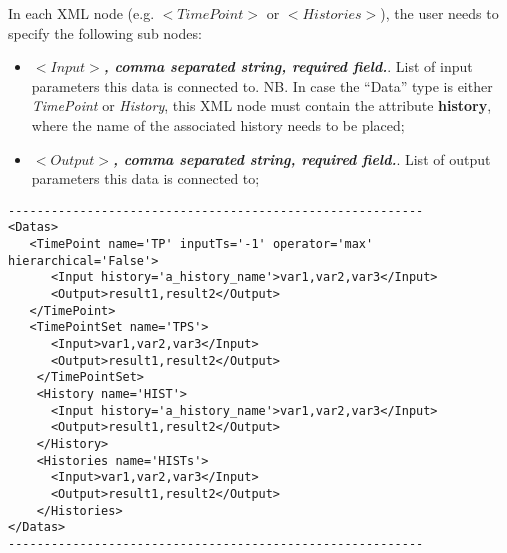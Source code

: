 \vspace{-5mm}
In each XML node (e.g. $<TimePoint>$ or $<Histories>$), the user needs to specify the following sub nodes:
\begin{itemize}
 \item $<Input>$\textbf{\textit{, comma separated string, required field.}}.  List of input parameters this data is connected to. NB. In case the ``Data'' type is either \textit{TimePoint} or  \textit{History}, this XML node must contain the attribute \textbf{history}, where the name of the associated history needs to be placed;
 \item $<Output>$\textbf{\textit{, comma separated string, required field.}}.  List of output parameters this data is connected to;
\end{itemize}

\begin{lstlisting}[style=XML]
----------------------------------------------------------
<Datas> 
   <TimePoint name='TP' inputTs='-1' operator='max' hierarchical='False'>  
      <Input history='a_history_name'>var1,var2,var3</Input>
      <Output>result1,result2</Output>
   </TimePoint> 
   <TimePointSet name='TPS'>  
      <Input>var1,var2,var3</Input>
      <Output>result1,result2</Output>
    </TimePointSet> 
    <History name='HIST'>  
      <Input history='a_history_name'>var1,var2,var3</Input>
      <Output>result1,result2</Output>
    </History> 
    <Histories name='HISTs'>  
      <Input>var1,var2,var3</Input>
      <Output>result1,result2</Output>
    </Histories> 
</Datas>
----------------------------------------------------------
\end{lstlisting}

